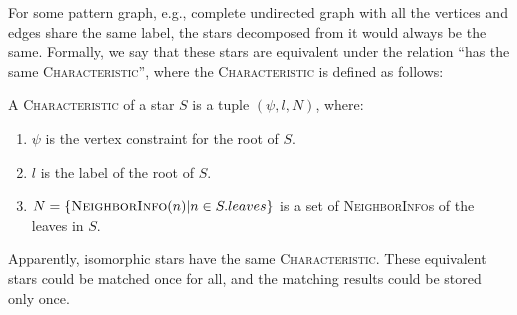For some pattern graph, e.g., complete undirected graph with all the vertices and edges share the same label,
the stars decomposed from it would always be the same.
Formally, we say that these stars are equivalent under the relation ``has the same \textsc{Characteristic}'',
where the \textsc{Characteristic} is defined as follows:
\begin{definition}[Characteristic]
  A \textsc{Characteristic} of a star $S$ is a tuple $(\psi, l, N)$, where:
  \begin{enumerate}[noitemsep,label={(\arabic*)}]
  \item $\psi$ is the vertex constraint for the root of $S$.
  \item $l$ is the label of the root of $S$.
  \item $N = \{ \textsc{NeighborInfo}(n) | n \in S.leaves\}$ is a set of \textsc{NeighborInfo}s of the leaves in $S$.
  \end{enumerate}
\end{definition}
Apparently, isomorphic stars have the same \textsc{Characteristic}.
These equivalent stars could be matched once for all,
and the matching results could be stored only once.

